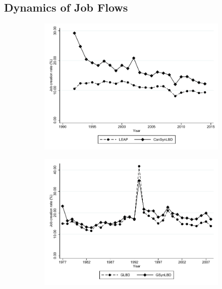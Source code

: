 \documentclass[10pt]{article}
\begin{document}
\subsection{Dynamics of Job Flows}

\begin{figure}[t]
\begin{subfigure}[h]{0.48\linewidth}
\includegraphics[trim=0 40 0 0,clip, width=\linewidth]{graphs/Job_creation_rate_by_year_private_bw.pdf}
\end{subfigure}
\hfill
\begin{subfigure}[h]{0.48\linewidth}
\includegraphics[trim=0 40 0 0,clip,width=\linewidth]{graphs/Job_creation_rate_by_year_bw_GsynLBD.pdf}
\end{subfigure}\\

\end{figure}
\end{document}
